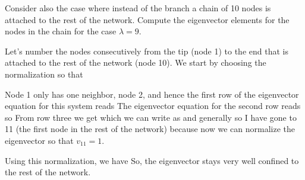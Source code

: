 \subquestion
Consider also the case where instead of the branch a chain of 10 nodes is attached to the rest of the network. Compute the eigenvector elements for the nodes in the chain for the case $\lambda=9$. 

\solution 
Let's number the nodes consecutively from the tip (node 1) to the end that is attached to the rest of the network (node 10). We start by choosing the normalization so that 

Node 1 only has one neighbor, node 2, and hence the first row of the eigenvector equation for this system reads 
The eigenvector equation for the second row reads 
so 
From row three we get 
which we can write as 
and generally 
so 
I have gone to 11 (the first node in the rest of the network) because now we can normalize the eigenvector so that $v_{11}=1$.

Using this normalization, we have 
So, the eigenvector stays very well confined to the rest of the network. 
